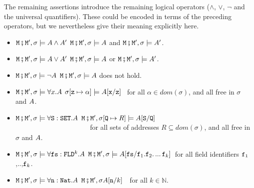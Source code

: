\begin{definition}
The remaining assertions introduce the remaining logical operators (\ie $\wedge$, $\vee$, $\neg$ and the universal quantifiers). These could be encoded in terms of the preceding operators, but we nevertheless give their meaning explicitly here.

\begin{itemize}
\item
$\M\mkpair \M', \sigma \models  \A \wedge \A'$   \IFF  $\M\mkpair \M', \sigma \models  \A $
and $\M\mkpair \M', \sigma \models  \A'$.
\item
$\M\mkpair \M', \sigma \models  \A \vee \A'$   \IFF  $\M\mkpair \M', \sigma \models  \A $
or $\M\mkpair \M', \sigma \models  \A'$.
\item
$\M\mkpair \M', \sigma \models  \neg\A$   \IFF  $\M\mkpair \M', \sigma \models  \A $
does not hold.
\item
$\M\mkpair \M', \sigma \models \forall x.\A$ \IFF  
$\sigma[\prg{z}\mapsto \alpha] \models  \A[\prg{x}/\prg{z}]$ \ for all  $\alpha\in dom(\sigma)$, and   all  free in $\sigma$ and $\A$.\item
$\M\mkpair \M', \sigma \models \forall \prg{S}:\prg{SET}.\A$ \IFF  $\M\mkpair \M', \sigma[\prg{Q}\mapsto R] \models  \A[\prg{S}/\prg{Q}]$ \\
$\strut ~ \hspace{1.4in} $ for all sets of addresses $R\subseteq dom(\sigma)$, and  all  free in $\sigma$ and $\A$.
 
\item
$\M\mkpair \M', \sigma \models \forall \prg{fs}:\prg{FLD}^k.\A$ \IFF  
$\M\mkpair \M', \sigma \models  \A[\prg{fs}/\prg{f}_1.\f_2.\,...\,\prg{f}_k]$\  for  all  field identifiers $\prg{f}_1$,..,$\prg{f}_k$.
\item
$\M\mkpair \M', \sigma \models  \forall \prg{n}:\prg{Nat}.\A$ \IFF  $\M\mkpair \M', \sigma \A[\prg{n}/k]$\ \ for all $k\in\mathbb{N}$.
\end{itemize}\end{definition} 


